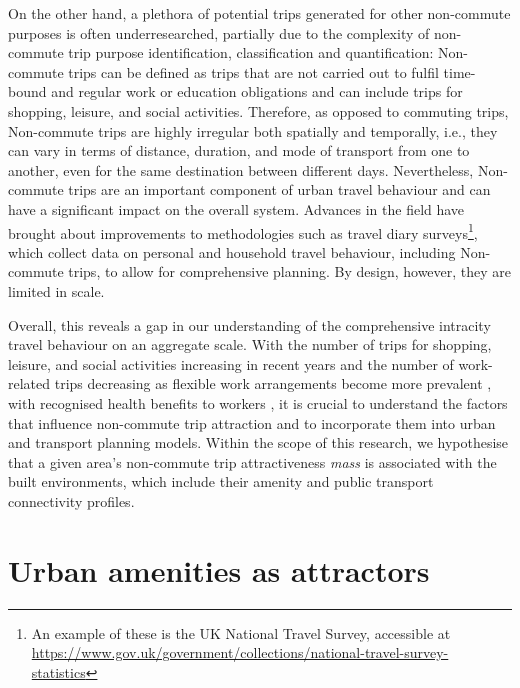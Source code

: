 On the other hand, a plethora of potential trips generated for other non-commute purposes is often underresearched, partially due to the complexity of non-commute trip purpose identification, classification and quantification: Non-commute trips can be defined as trips that are not carried out to fulfil time-bound and regular work or education obligations and can include trips for shopping, leisure, and social activities. Therefore, as opposed to commuting trips, Non-commute trips are highly irregular both spatially and temporally, i.e., they can vary in terms of distance, duration, and mode of transport from one to another, even for the same destination between different days. Nevertheless, Non-commute trips are an important component of urban travel behaviour and can have a significant impact on the overall system. Advances in the field have brought about improvements to methodologies such as travel diary surveys\footnote{An example of these is the UK National Travel Survey, accessible at \url{https://www.gov.uk/government/collections/national-travel-survey-statistics}}, which collect data on personal and household travel behaviour, including Non-commute trips, to allow for comprehensive planning. By design, however, they are limited in scale.

Overall, this reveals a gap in our understanding of the comprehensive intracity travel behaviour on an aggregate scale. With the number of trips for shopping, leisure, and social activities increasing in recent years and the number of work-related trips decreasing as flexible work arrangements become more prevalent \citep{wohnerWorkFlexiblyTravel2022}, with recognised health benefits to workers \citep{macleodCommutingWorkPostpandemic2022}, it is crucial to understand the factors that influence non-commute trip attraction and to incorporate them into urban and transport planning models. Within the scope of this research, we hypothesise that a given area's non-commute trip attractiveness \textit{mass} is associated with the built environments, which include their amenity and public transport connectivity profiles. 

\section{Urban amenities as attractors}

